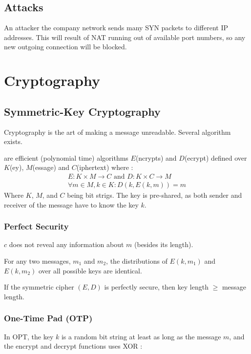 \section{Attacks}

An attacker  the company network sends many SYN packets to different IP addresses. This will result of NAT running out of available port numbers, so any new outgoing connection will be blocked.

\chapter{Cryptography}

\section{Symmetric-Key Cryptography}

Cryptography is the art of making a message unreadable. Several algorithm exists.

 are efficient (polynomial time) algorithms $E$(ncrypts) and $D$(ecrypt) defined over $K$(ey), $M$(essage) and $C$(iphertext) where :
\begin{align*}
E : K \times M \rightarrow C \text{ and } D : K \times C \rightarrow M\\
\forall m \in M, k \in K : D(k, E(k, m)) = m
\end{align*}
Where $K$, $M$, and $C$ being bit strigs. The key is pre-shared, as both sender and receiver of the message have to know the key $k$.

\subsection{Perfect Security}

$c$ does not reveal any information about $m$ (besides its length).

For any two messages, $m_1$ and $m_2$, the distributions of $E(k, m_1)$ and $E(k, m_2)$ over all possible keys are identical.

If the symmetric cipher $(E, D)$ is perfectly secure, then key length $\geq$ message length.

\subsection{One-Time Pad (OTP)}

In OPT, the key $k$ is a random bit string at least as long as the message $m$, and the encrypt and decrypt functions uses XOR :

